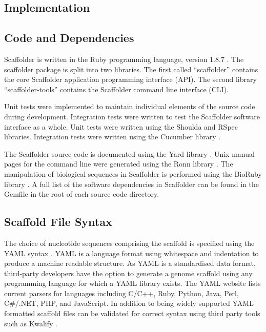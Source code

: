 \documentclass[10pt]{bmc_article}
\newenvironment{bmcformat}{\begin{raggedright}\baselineskip20pt\sloppy\setboolean{publ}{false}}{\end{raggedright}\baselineskip20pt\sloppy}
\begin{document}
\begin{bmcformat}
\clearpage

\section*{Implementation} %

\subsection*{Code and Dependencies} %

Scaffolder is written in the Ruby programming language, version 1.8.7
\cite{ruby-lang}. The scaffolder package is split into two libraries. The first
called ``scaffolder'' contains the core Scaffolder application programming
interface (API). The second library ``scaffolder-tools'' contains the
Scaffolder command line interface (CLI). \pb

Unit tests were implemented to maintain individual elements of the source code
during development. Integration tests were written to test the Scaffolder
software interface as a whole. Unit tests were written using the Shoulda and
RSpec \cite{rspec} libraries.  Integration tests were written using the
Cucumber library \cite{rspec}. \pb

The Scaffolder source code is documented using the Yard library \cite{yard}.
Unix manual pages for the command line were generated using the Ronn library
\cite{ronn}. The manipulation of biological sequences in Scaffolder is
performed using the BioRuby library \cite{goto2010}. A full list of the
software dependencies in Scaffolder can be found in the Gemfile in the root of
each source code directory. \pb

\subsection*{Scaffold File Syntax} %

The choice of nucleotide sequences comprising the scaffold is specified using
the YAML syntax \cite{yaml}. YAML is a language format using whitespace and
indentation to produce a machine readable structure. As YAML is a standardised
data format, third-party developers have the option to generate a genome
scaffold using any programming language for which a YAML library exists. The
YAML website lists current parsers for languages including C/C++, Ruby, Python,
Java, Perl, C\#/.NET, PHP, and JavaScript. In addition to being widely
supported YAML formatted scaffold files can be validated for correct syntax
using third party tools such as Kwalify \cite{kwalify}. \pb


\end{bmcformat}
\end{document}
